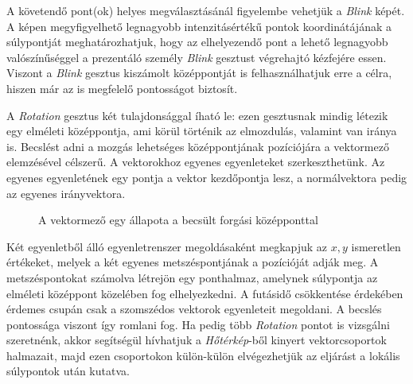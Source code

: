 A követendő pont(ok) helyes megválasztásánál figyelembe vehetjük a \textit{Blink} képét. A képen megyfigyelhető legnagyobb intenzitásértékű pontok koordinátájának a súlypontját meghatározhatjuk, hogy az elhelyezendő pont a lehető legnagyobb valószínűséggel a prezentáló személy \textit{Blink} gesztust végrehajtó kézfejére essen. Viszont a \textit{Blink} gesztus kiszámolt középpontját is felhasználhatjuk erre a célra, hiszen már az is megfelelő pontosságot biztosít.


A \textit{Rotation} gesztus két tulajdonsággal íható le: ezen gesztusnak mindig létezik egy elméleti középpontja, ami körül történik az elmozdulás, valamint van iránya is.
Becslést adni a mozgás lehetséges középpontjának pozíciójára a vektormező elemzésével célszerű.
A vektorokhoz egyenes egyenleteket szerkeszthetünk. Az egyenes egyenletének egy pontja a vektor kezdőpontja lesz, a normálvektora pedig az egyenes irányvektora.

\begin{figure}[h]
\centering
{}
\caption{A vektormező egy állapota a becsült forgási középponttal}
\label{fig:rotation}
\end{figure}

Két egyenletből álló egyenletrenszer megoldásaként megkapjuk az $x,y$ ismeretlen értékeket, melyek a két egyenes metszéspontjának a pozícióját adják meg.
A metszéspontokat számolva létrejön egy ponthalmaz, amelynek súlypontja az elméleti középpont közelében fog elhelyezkedni. A futásidő csökkentése érdekében érdemes csupán csak a szomszédos vektorok egyenleteit megoldani. A becslés pontossága viszont így romlani fog.
Ha pedig több \textit{Rotation} pontot is vizsgálni szeretnénk, akkor segítségül hívhatjuk a \textit{Hőtérkép}-ből kinyert vektorcsoportok halmazait, majd ezen csoportokon külön-külön elvégezhetjük az eljárást a lokális súlypontok után kutatva.


